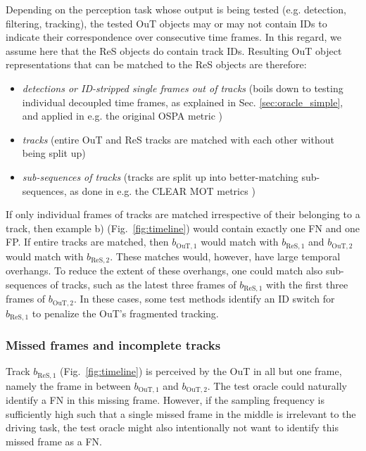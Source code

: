 \documentclass[conference]{IEEEtran}
\begin{document}
Depending on the perception task whose output is being tested (e.g. detection, filtering, tracking), the tested OuT objects may or may not contain IDs to indicate their correspondence over consecutive time frames. 
In this regard, we assume here that the ReS objects do contain track IDs. 
Resulting OuT object representations that can be matched to the ReS objects are therefore:
\begin{itemize}
\item \textit{detections or ID-stripped single frames out of tracks} (boils down to testing individual decoupled time frames, as explained in Sec. \ref{sec:oracle_simple}, and applied in e.g. the original OSPA metric \cite{schuhmacher2008consistent}) %
\item \textit{tracks} (entire OuT and ReS tracks are matched with each other without being split up)
\item \textit{sub-sequences of tracks} (tracks are split up into better-matching sub-sequences, as done in e.g. the CLEAR MOT metrics \cite{bernardin2008evaluating})
\end{itemize}

If only individual frames of tracks are matched irrespective of their belonging to a track, then example b) (Fig.~\ref{fig:timeline}) would contain exactly one FN and one FP. 
If entire tracks are matched, then $b_{\text{OuT},1}$ would match with $b_{\text{ReS},1}$ and $b_{\text{OuT},2}$ would match with $b_{\text{ReS},2}$.
These matches would, however, have large temporal overhangs.
To reduce the extent of these overhangs, one could match also sub-sequences of tracks, such as the latest three frames of $b_{\text{ReS},1}$ with the first three frames of $b_{\text{OuT},2}$.
In these cases, some test methods identify an ID switch for $b_{\text{ReS},1}$ to penalize the OuT's fragmented tracking.

\subsubsection{Missed frames and incomplete tracks}
\label{sec:temp_incomplete}

Track $b_{\text{ReS},1}$ (Fig.~\ref{fig:timeline}) is perceived by the OuT in all but one frame, namely the frame in between $b_{\text{OuT},1}$ and $b_{\text{OuT},2}$. 
The test oracle could naturally identify a FN in this missing frame. 
However, if the sampling frequency is sufficiently high such that a single missed frame in the middle is irrelevant to the driving task, the test oracle might also intentionally not want to identify this missed frame as a FN. 
\end{document}
